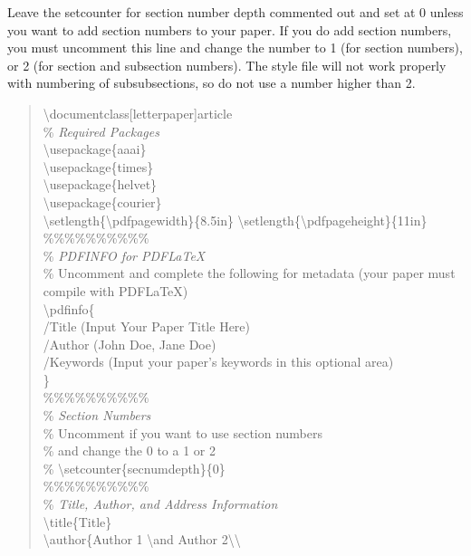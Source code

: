 \documentclass[letterpaper]{article}
\begin{document}
	Leave the setcounter for section number depth commented out and set at 0 unless you want to add section numbers to your paper. If you do add section numbers, you must uncomment this line and change the number to 1 (for section numbers), or 2 (for section and subsection numbers). The style file will not work properly with numbering of subsubsections, so do not use a number higher than 2.
	
	
	\begin{quote}
		\begin{small}
			\textbackslash documentclass[letterpaper]{article}\\
			\% \textit{Required Packages}\\
			\textbackslash usepackage\{aaai\}\\
			\textbackslash usepackage\{times\}\\
			\textbackslash usepackage\{helvet\}\\
			\textbackslash usepackage\{courier\}\\
			\textbackslash setlength\{\textbackslash pdfpagewidth\}\{8.5in\}
			\textbackslash setlength\{\textbackslash pdfpageheight\}\{11in\}\\
			\%\%\%\%\%\%\%\%\%\%\\
			\% \textit{PDFINFO for PDF\LaTeX{}}\\
			\% Uncomment and complete the following for metadata (your paper must compile with PDF\LaTeX{})\\
			\textbackslash pdfinfo\{\\
			/Title (Input Your Paper Title Here)\\
			/Author (John Doe, Jane Doe)\\
			/Keywords (Input your paper's keywords in this optional area)\\
			\}\\
			\%\%\%\%\%\%\%\%\%\%\\
			\% \textit{Section Numbers}\\
			\% Uncomment if you want to use section numbers\\
			\% and change the 0 to a 1 or 2\\
			\% \textbackslash setcounter\{secnumdepth\}\{0\}\\
			\%\%\%\%\%\%\%\%\%\%\\
			\% \textit{Title, Author, and Address Information}\\
			\textbackslash title\{Title\}\\
			\textbackslash author\{Author 1 \textbackslash and Author 2\textbackslash\textbackslash \\ 

\end{small}
\end{quote}
\end{document}
